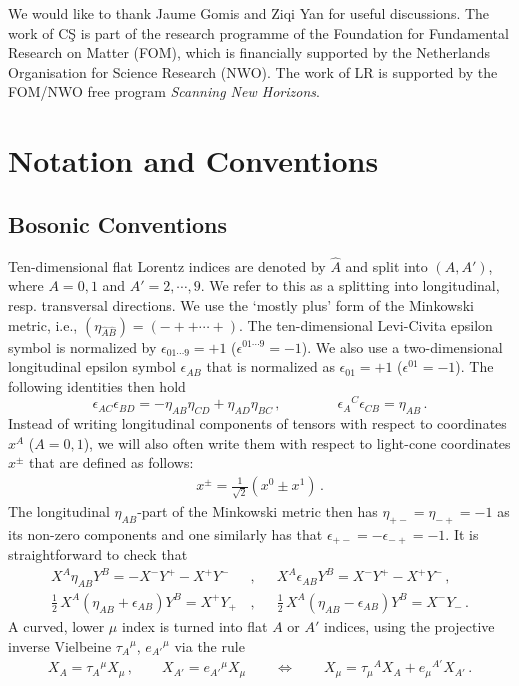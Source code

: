 \documentclass[a4paper,10pt,openany]{article}
\newcommand{\lr}{\left(}
\newcommand{\rr}{\right)}
\begin{document}
	We would like to thank Jaume Gomis and Ziqi Yan for useful discussions.  The work of C\c S is part of the research programme of the Foundation for Fundamental Research on Matter (FOM), which is financially supported by the Netherlands Organisation for Science Research (NWO). The work of LR is supported by the FOM/NWO free program {\sl Scanning New Horizons}.
	
	\appendix
	
	\section{Notation and Conventions}\label{sec:conventions}
	
	\subsection{Bosonic Conventions} \label{ssec:bosconventions}
	
	Ten-dimensional flat Lorentz indices are denoted by $\hat A$ and split into $(A,A')$, where $A=0,1$ and $A'=2,\cdots,9$. We refer to this as a splitting into longitudinal, resp. transversal directions. We use the `mostly plus' form of the Minkowski metric, i.e., $(\eta_{\hat A\hat B}) = (-++\cdots +)$. The ten-dimensional Levi-Civita epsilon symbol is normalized by $\epsilon_{01\cdots 9}=+1$ ($\epsilon^{01\cdots 9} = -1$). We also use a two-dimensional longitudinal epsilon symbol $\epsilon_{AB}$ that is normalized as $\epsilon_{01}=+1$ ($\epsilon^{01}=-1$). %
	The following identities then hold
	\begin{equation}
		\label{eq:epsids}
		\epsilon_{AC} \epsilon_{BD} = -\eta_{AB} \eta_{CD} + \eta_{AD} \eta_{BC} \,, \qquad \qquad \epsilon_A{}^C \epsilon_{CB} = \eta_{AB} \,.
	\end{equation}
	Instead of writing longitudinal components of tensors with respect to coordinates $x^A$ ($A=0,1$), we will also often write them with respect to light-cone coordinates $x^\pm$ that are defined as follows:
	\begin{align}
		x^\pm = \frac{1}{\sqrt2}\lr x^0 \pm x^1\rr\,.
	\end{align}
	The longitudinal $\eta_{AB}$-part of the Minkowski metric then has $\eta_{+-}= \eta_{-+} = -1$ as its non-zero components and one similarly has that $\epsilon_{+-}= - \epsilon_{-+} = -1$. It is straightforward to check that
	\begin{align}
		X^A\eta_{AB}Y^B =  - X^- Y^+-X^+Y^-\,&,& &X^A\epsilon_{AB}Y^B = X^-Y^+ - X^+Y^-\,,\\
		\frac12\,X^A\lr\eta_{AB}+\epsilon_{AB}\rr Y^B = X^+ Y_+\,&, & &\frac12\,X^A\lr\eta_{AB}-\epsilon_{AB}\rr Y^B = X^- Y_-\,.\label{eq:+-proj}
	\end{align}
	A curved, lower $\mu$ index is turned into flat $A$ or $A'$ indices, using the projective inverse Vielbeine $\tau_A{}^\mu$, $e_{A'}{}^\mu$ via the rule
	\begin{align} \label{eq:curvedflatrule}
		X_A = \tau_A{}^\mu X_\mu \,, \qquad X_{A'} = e_{A'}{}^\mu X_\mu \qquad \Leftrightarrow \qquad X_\mu = \tau_\mu{}^A X_A + e_\mu{}^{A'} X_{A'} \,.
	\end{align}
	
\end{document}
